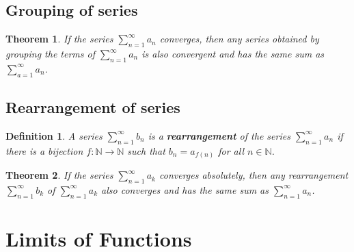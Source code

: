 \documentclass[8pt]{article}
\newtheorem{definition}{Definition}[section]
\newtheorem{theorem}{Theorem}[section]
\theoremstyle{definition}
\begin{document}
\subsection{Grouping of series}
\begin{theorem}\normalfont If the series $\sum_{n=1}^\infty a_n$ converges, then any series obtained by grouping the terms of $\sum_{n=1}^\infty a_n$ is also convergent and has the same sum as $\sum_{a=1}^\infty a_n$.
\end{theorem}
\subsection{Rearrangement of series}
\begin{definition}\normalfont A series $\sum_{n=1}^\infty b_n$ is a \textbf{rearrangement} of the series $\sum_{n=1}^\infty a_n$ if there is a bijection $f:\mathbb{N}\to\mathbb{N}$ such that $b_n=a_{f(n)}$ for all $n\in \mathbb{N}$.
\end{definition}
\begin{theorem}\normalfont If the series $\sum_{n=1}^\infty a_k$ converges absolutely, then any rearrangement $\sum_{n=1}^\infty b_k$ of $\sum_{n=1}^\infty a_k$ also converges and has the same sum as $\sum_{n=1}^\infty a_n$.
\end{theorem}
 
\section{Limits of Functions}
\end{document}
